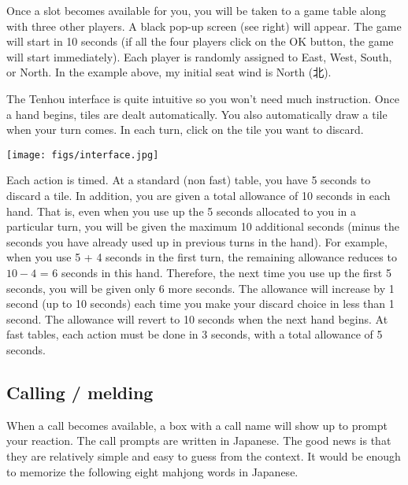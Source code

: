 Once a slot becomes available for you, you will be taken to a game table along with three other players. A black pop-up screen (see right) will appear. The game will start in 10 seconds (if all the four players click on the OK button, the game will start immediately). Each player is randomly assigned to East, West, South, or North. In the example above, my initial seat wind is North (北). 

\bigskip
The {\jap Tenhou} interface is quite intuitive so you won't need much instruction. 
Once a hand begins, tiles are dealt automatically. You also automatically draw a tile when your turn comes. 
In each turn, click on the tile you want to discard. 

\begin{center}
\texttt{[image: figs/interface.jpg]}
\end{center}
\vspace{-25pt}

\bigskip
Each action is timed. At a standard (non fast) table, you have 5 seconds to discard a tile. In addition, you are given a total allowance of 10 seconds in each hand. That is, even when you use up the 5 seconds allocated to you in a particular turn, you will be given the maximum 10 additional seconds (minus the seconds you have already used up in previous turns in the hand). For example, when you use 5 + 4 seconds in the first turn, the remaining allowance reduces to $10 - 4$ = 6 seconds in this hand. Therefore, the next time you use up the first 5 seconds, you will be given only 6 more seconds. The allowance will increase by 1 second (up to 10 seconds) each time you make your discard choice in less than 1 second. The allowance will revert to 10 seconds when the next hand begins. At fast tables, each action must be done in 3 seconds, with a total allowance of 5 seconds.

\subsection{Calling / melding}
When a call becomes available, a box with a call name will show up to prompt your reaction. 
The call prompts are written in Japanese. The good news is that they are relatively simple and easy to guess from the context. It would be enough to memorize the following eight mahjong words in Japanese. 

